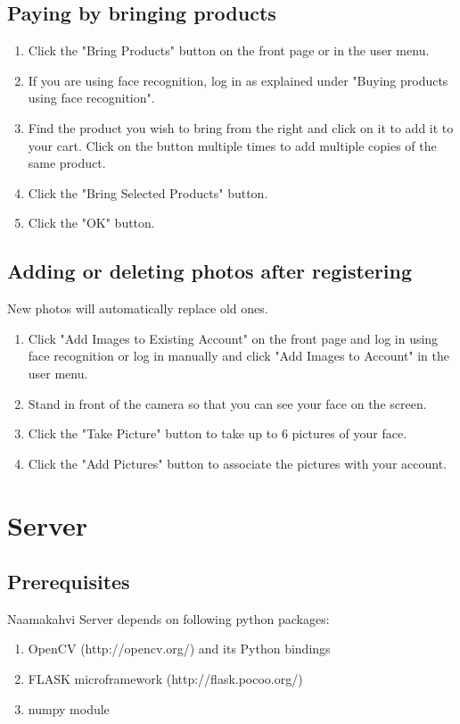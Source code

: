 \documentclass[11pt]{article}
\begin{document}
\subsection{Paying by bringing products}
\begin{enumerate}
\item{Click the "Bring Products" button on the front page or in the user menu.}
\item{If you are using face recognition, log in as explained under "Buying products using
face recognition".}
\item{Find the product you wish to bring from the right and click on it to add it to your cart.
Click on the button multiple times to add multiple copies of the same product.}
\item{Click the "Bring Selected Products" button.}
\item{Click the "OK" button.}
\end{enumerate}
\subsection{Adding or deleting photos after registering}
New photos will automatically replace old ones.
\begin{enumerate}
\item{Click "Add Images to Existing Account" on the front page and log in using face recognition
or log in manually and click "Add Images to Account" in the user menu.}
\item{Stand in front of the camera so that you can see your face on the screen.}
\item{Click the "Take Picture" button to take up to 6 pictures of your face.}
\item{Click the "Add Pictures" button to associate the pictures with your account.}
\end{enumerate}

\section{Server}
\subsection{Prerequisites}
Naamakahvi Server depends on following python packages:
\begin{enumerate}
\item{OpenCV (http://opencv.org/) and its Python bindings}
\item{FLASK microframework (http://flask.pocoo.org/)}
\item{numpy module}
\end{enumerate}
\newpage
\end{document}

